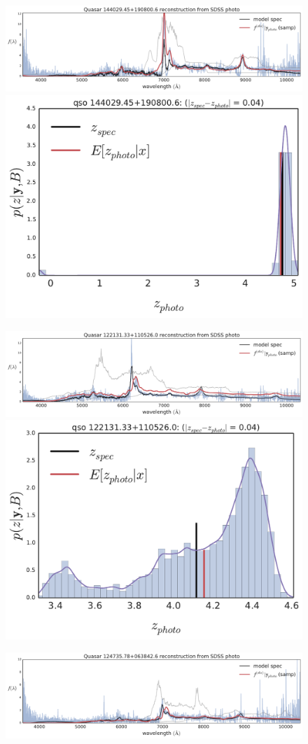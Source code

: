 \documentclass{article}
\begin{document}
\begin{figure}[t]
\centerline{
\includegraphics[width=1.5\columnwidth]{../../figs/quasar_plots/close_hi/quasar_248_mcmc_recon}
\includegraphics[width=.56\columnwidth]{../../figs/quasar_plots/close_hi/quasar_248_posterior_z}
}
\centerline{
\includegraphics[width=1.5\columnwidth]{../../figs/quasar_plots/close_hi/quasar_1786_mcmc_recon}
\includegraphics[width=.56\columnwidth]{../../figs/quasar_plots/close_hi/quasar_1786_posterior_z}
}
\centerline{
\includegraphics[width=1.5\columnwidth]{../../figs/quasar_plots/close_hi/quasar_1854_mcmc_recon}
}
\end{figure}
\end{document}
